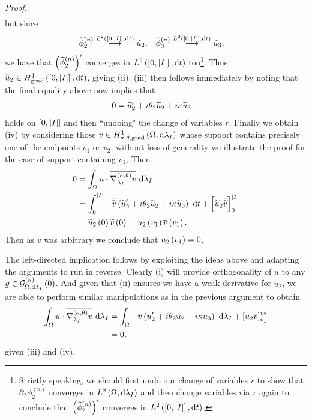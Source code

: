 \begin{proof}
\begin{align*}
	\end{align*}
	but since
	\begin{align*}
		\widetilde{\phi}_2^{(n)} \overset{L^{2}\left( \left[ 0,\left\lvert I \right\rvert \right],\mathrm{d}t \right)}{\longrightarrow} \widetilde{u}_2,
		&\quad \widetilde{\phi}_3^{(n)} \overset{L^{2}\left( \left[ 0,\left\lvert I \right\rvert \right],\mathrm{d}t \right)}{\longrightarrow} \widetilde{u}_3,
	\end{align*}
	we have that $\left( \widetilde{\phi}_2^{(n)} \right)'$ converges in $L^{2}\left( \left[ 0,\left\lvert I \right\rvert \right],\mathrm{d}t \right)$ too\footnote{Strictly speaking, we should first undo our change of variables $r$ to show that $\partial_2\phi_2^{(n)}$ converges in $L^{2}\left( \Omega,\mathrm{d}\lambda_I \right)$ and then change variables via $r$ again to conclude that $\left( \widetilde{\phi}_2^{(n)} \right)'$ converges in $L^{2}\left( \left[ 0,\left\lvert I \right\rvert \right],\mathrm{d}t \right)$.}.
	Thus $\widetilde{u}_2\in H^1_\mathrm{grad}\left( \left[ 0,\left\lvert I \right\rvert \right], \mathrm{d}t \right)$, giving (ii).
	(iii) then follows immediately by noting that the final equality above now implies that
	\begin{align*}
		0 &= \widetilde{u}_2' + i\theta_2\widetilde{u}_2 + i\kappa\widetilde{u}_3
	\end{align*}
	holds on $\left[ 0,\left\lvert I \right\rvert \right]$ and then ``undoing" the change of variables $r$.
	Finally we obtain (iv) by considering those $v\in H^1_{\kappa,\theta,\mathrm{grad}}\left( \Omega, \mathrm{d}\lambda_I \right)$ whose support contains precisely one of the endpoints $v_1$ or $v_2$; without loss of generality we illustrate the proof for the case of support containing $v_1$,
	Then
	\begin{align*}
		0 &= \int_{\Omega} u\cdot\overline{\nabla^{\left( \kappa, \theta \right)}_{\lambda_I}v}  \ \mathrm{d}\lambda_I \\
		&= \int_0^{\left\lvert I \right\rvert} -\overline{\widetilde{v}}\left( \widetilde{u}_2' + i\theta_2\widetilde{u}_2 + i\kappa\widetilde{u}_3 \right) \ \mathrm{d} t + \left[ \widetilde{u}_2\overline{\widetilde{v}} \right]_0^{\left\lvert I \right\rvert} \\
		&= \widetilde{u}_2\left( 0 \right)\overline{\widetilde{v}}\left( 0 \right)
		= u_2\left( v_1 \right)\overline{v}\left( v_1 \right).
	\end{align*}
	Then as $v$ was arbitrary we conclude that $u_2\left( v_1 \right)=0$. \newline
	
	The left-directed implication follows by exploiting the ideas above and adapting the arguments to run in reverse.
	Clearly (i) will provide orthogonality of $u$ to any $g\in\mathcal{G}_{ \Omega, \mathrm{d}\lambda_I}^{(\kappa)}\left( 0 \right)$.
	And given that (ii) ensures we have a weak derivative for $\widetilde{u}_2$, we are able to perform similar manipulations as in the previous argument to obtain
	\begin{align*}
		\int_{\Omega} u\cdot\overline{\nabla^{\left( \kappa, \theta \right)}_{\lambda_I}v}  \ \mathrm{d}\lambda_I
		&= \int_{\Omega} -\overline{v}\left( u_2' + i\theta_2 u_2 + i\kappa u_3 \right)  \ \mathrm{d}\lambda_I + \left[ u_2\overline{v} \right]_{v_1}^{v_2} \\
		&= 0,
	\end{align*}
	given (iii) and (iv).
\end{proof}
